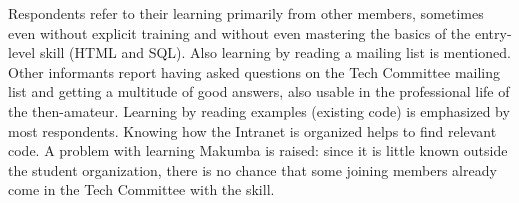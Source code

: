 \documentclass{llncs}
\begin{document}
Respondents refer to their learning primarily from other members, sometimes even without explicit training and without even mastering the basics of the entry-level skill (HTML and SQL). Also learning by reading a mailing list is mentioned. Other informants report having asked questions on the Tech Committee mailing list and getting a multitude of good answers, also usable in the professional life of the then-amateur. %
%	
Learning by reading examples (existing code) is emphasized by most respondents. Knowing how the Intranet is organized helps to find relevant code.
A problem with learning Makumba is raised: since it is little known outside the student organization, there is no chance that some joining members already come in the Tech Committee with the skill.
\end{document}
